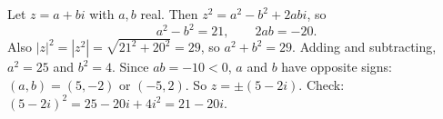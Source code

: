 Let $z=a+bi$ with $a,b$ real. Then $z^2=a^2-b^2+2abi$, so
\[
a^2-b^2=21,\qquad 2ab=-20 .
\]
Also $|z|^2=|z^2|=\sqrt{21^2+20^2}=29$, so $a^2+b^2=29$. Adding and subtracting, $a^2=25$ and $b^2=4$. Since $ab=-10<0$, $a$ and $b$ have opposite signs: $(a,b)=(5,-2)$ or $(-5,2)$. So $z=\boxed{\pm(5-2i)}$. Check: $(5-2i)^2=25-20i+4i^2=21-20i$.
